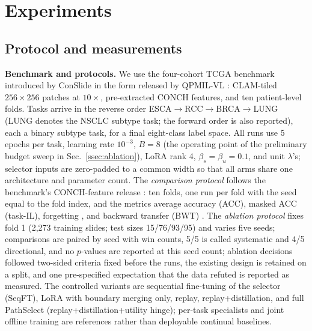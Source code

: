 \documentclass{article}
\begin{document}
\section{Experiments}
\label{sec:exp}

\subsection{Protocol and measurements}

\textbf{Benchmark and protocols.}
We use the four-cohort TCGA benchmark introduced by ConSlide \cite{huang2023conslide} in the form released by QPMIL-VL \cite{gou2025qpmil}: CLAM-tiled $256\times256$ patches at $10\times$, pre-extracted CONCH features, and ten patient-level folds. Tasks arrive in the reverse order ESCA$\rightarrow$RCC$\rightarrow$BRCA$\rightarrow$LUNG (LUNG denotes the NSCLC subtype task; the forward order is also reported), each a binary subtype task, for a final eight-class label space. All runs use 5 epochs per task, learning rate $10^{-3}$, $B=8$ (the operating point of the preliminary budget sweep in Sec.~\ref{ssec:ablation}), LoRA rank 4, $\beta_s{=}\beta_u{=}0.1$, and unit $\lambda$'s; selector inputs are zero-padded to a common width so that all arms share one architecture and parameter count. The \emph{comparison protocol} follows the benchmark's CONCH-feature release \cite{gou2025qpmil}: ten folds, one run per fold with the seed equal to the fold index, and the metrics average accuracy (ACC), masked ACC (task-IL), forgetting \cite{chaudhry2018rwalk}, and backward transfer (BWT) \cite{lopezpaz2017gem}. The \emph{ablation protocol} fixes fold 1 (2,273 training slides; test sizes 15/76/93/95) and varies five seeds; comparisons are paired by seed with win counts, 5/5 is called systematic and 4/5 directional, and no $p$-values are reported at this seed count; ablation decisions followed two-sided criteria fixed before the runs, the existing design is retained on a split, and one pre-specified expectation that the data refuted is reported as measured. The controlled variants are sequential fine-tuning of the selector (SeqFT), LoRA with boundary merging only, replay, replay+distillation, and full PathSelect (replay+distillation+utility hinge); per-task specialists and joint offline training are references rather than deployable continual baselines.
\end{document}
